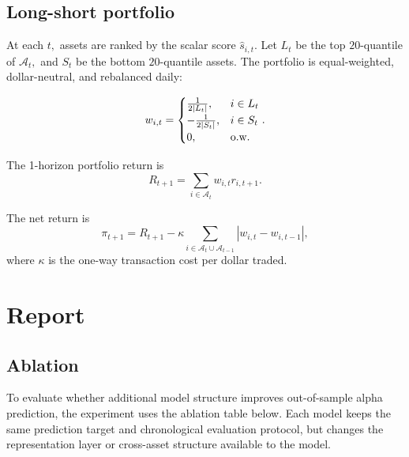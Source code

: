 \documentclass[11pt]{article}
\begin{document}
\subsection{Long-short portfolio}

At each $t,$ assets are ranked by the scalar score $\hat s_{i,t}.$ Let $L_t$ be the top $20$-quantile of $\mathcal A_t,$ and $S_t$ be the bottom $20$-quantile assets. The portfolio is equal-weighted, dollar-neutral, and rebalanced daily:

\[w_{i,t} = \begin{cases}
    \frac{1}{2|L_t|},& i \in L_t\\
   -\frac{1}{2|S_t|},& i \in S_t\\
    0,& \text{o.w.}
\end{cases}.\]

The 1-horizon portfolio return is \[R_{t+1} = \sum_{i\in \mathcal A_t} w_{i,t} r_{i,t+1}.\]

The net return is \[\pi _{t+1} = R_{t+1} - \kappa \sum_{i\in \mathcal A_t\cup \mathcal A_{t-1}} |w_{i,t}-w_{i,t-1}|,\] where $\kappa$ is the one-way transaction cost per dollar traded.


\section{Report}


\subsection{Ablation}

To evaluate whether additional model structure improves out-of-sample alpha prediction, the experiment uses the ablation table below. Each model keeps the same prediction target and chronological evaluation protocol, but changes the representation layer or cross-asset structure available to the model.
\end{document}
